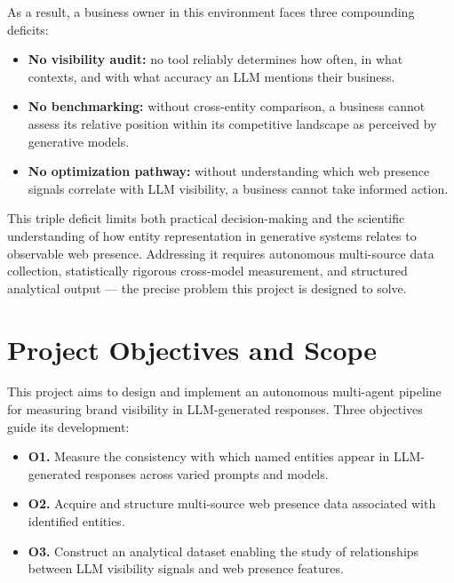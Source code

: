 As a result, a business owner in this environment faces three compounding deficits:

\begin{itemize}[label=\textbullet]
    \item \textbf{No visibility audit:} no tool reliably determines how often, in
    what contexts, and with what accuracy an LLM mentions their business.

    \item \textbf{No benchmarking:} without cross-entity comparison, a business
    cannot assess its relative position within its competitive landscape as perceived
    by generative models.

    \item \textbf{No optimization pathway:} without understanding which web presence
    signals correlate with LLM visibility, a business cannot take informed action.
\end{itemize}

This triple deficit limits both practical decision-making and the scientific
understanding of how entity representation in generative systems relates to
observable web presence. Addressing it requires autonomous multi-source data
collection, statistically rigorous cross-model measurement, and structured analytical
output — the precise problem this project is designed to solve.

\section{Project Objectives and Scope}

This project aims to design and implement an autonomous multi-agent pipeline for
measuring brand visibility in LLM-generated responses. Three objectives guide its
development:

\begin{itemize}[label=\textbullet]
    \item \textbf{O1.} Measure the consistency with which named entities appear in
    LLM-generated responses across varied prompts and models.

    \item \textbf{O2.} Acquire and structure multi-source web presence data
    associated with identified entities.

    \item \textbf{O3.} Construct an analytical dataset enabling the study of
    relationships between LLM visibility signals and web presence features.
\end{itemize}

